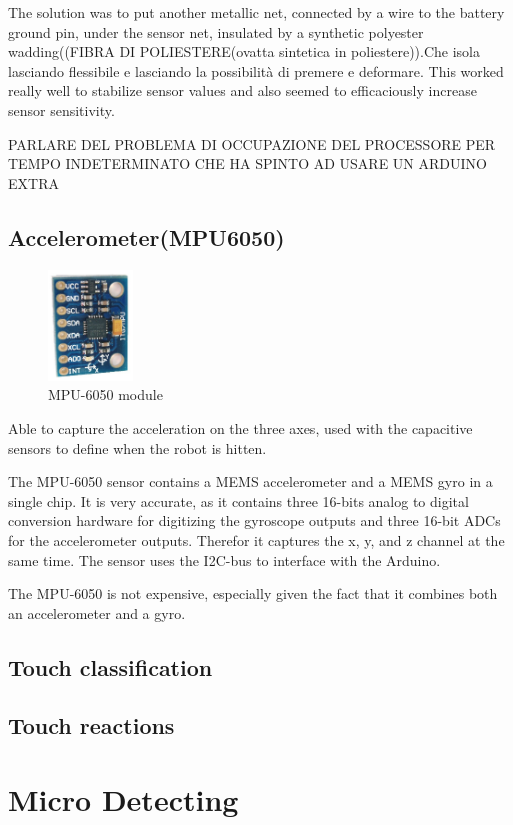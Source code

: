 The solution was to put another metallic net, connected by a wire to the battery ground pin, under the sensor net, insulated by a synthetic polyester wadding((FIBRA DI POLIESTERE(ovatta sintetica in poliestere)).Che isola lasciando flessibile e lasciando la possibilità di premere e deformare. This worked really well to stabilize sensor values and also seemed to efficaciously increase sensor sensitivity.

PARLARE DEL PROBLEMA DI OCCUPAZIONE DEL PROCESSORE PER TEMPO INDETERMINATO CHE HA SPINTO AD USARE UN ARDUINO EXTRA


\subsection{Accelerometer(MPU6050)}

\begin{figure}[h]
	\centering
	\includegraphics[width=0.2\textwidth]{mpu6050}
	\caption{MPU-6050 module}
\end{figure}


Able to capture the acceleration on the three axes, used with the capacitive sensors to define when the robot is hitten.

The MPU-6050 sensor contains a MEMS accelerometer and a MEMS gyro in a single chip. It is very accurate, as it contains three 16-bits analog to digital conversion hardware for digitizing the gyroscope outputs
and three 16-bit ADCs for the accelerometer outputs. Therefor it captures the x, y, and z channel at the same time. The sensor uses the I2C-bus to interface with the Arduino.\cite{MPU6050}

The MPU-6050 is not expensive, especially given the fact that it combines both an accelerometer and a gyro.
\subsection{Touch classification}
\subsection{Touch reactions}
\section{Micro Detecting}
